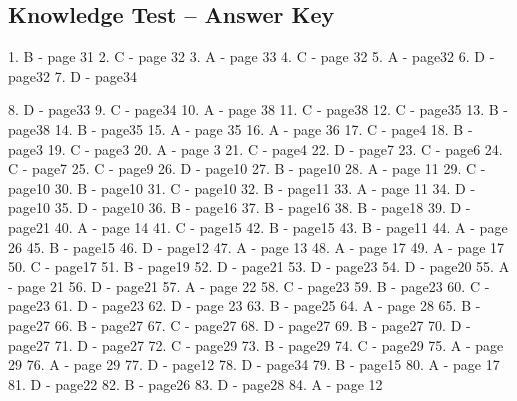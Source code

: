\subsection{Knowledge Test – Answer Key}

%		


1. B - page 31
2. C - page 32
3. A - page 33
4. C - page 32
5. A - page32
6. D - page32
7. D - page34

8. D - page33
9. C - page34
10. A - page 38
11. C - page38
12. C - page35
13. B - page38
14. B - page35
15. A - page 35
16. A - page 36
17. C - page4
18. B - page3
19. C - page3
20. A - page 3
21. C - page4
22. D - page7
23. C - page6
24. C - page7
25. C - page9
26. D - page10
27. B - page10
28. A - page 11
29. C - page10
30. B - page10
31. C - page10
32. B - page11
33. A - page 11
34. D - page10
35. D - page10
36. B - page16
37. B - page16
38. B - page18
39. D - page21
40. A - page 14
41. C - page15
42. B - page15
43. B - page11
44. A - page 26
45. B - page15
46. D - page12
47. A - page 13
48. A - page 17
49. A - page 17
50. C - page17
51. B - page19
52. D - page21
53. D - page23
54. D - page20
55. A - page 21
56. D - page21
57. A - page 22
58. C - page23
59. B - page23
60. C - page23
61. D - page23
62. D - page 23
63. B - page25
64. A - page 28
65. B - page27
66. B - page27
67. C - page27
68. D - page27
69. B - page27
70. D - page27
71. D - page27
72. C - page29
73. B - page29
74. C - page29
75. A - page 29
76. A - page 29
77. D - page12
78. D - page34
79. B - page15
80. A - page 17
81. D - page22
82. B - page26
83. D - page28
84. A - page 12